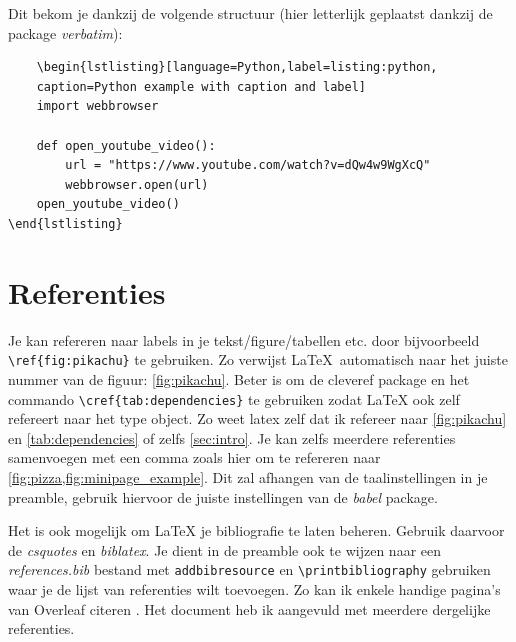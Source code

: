 \documentclass{article}
\begin{document}
Dit bekom je dankzij de volgende structuur (hier letterlijk geplaatst dankzij de package \textit{verbatim}):
\begin{verbatim}
    \begin{lstlisting}[language=Python,label=listing:python,
    caption=Python example with caption and label]    
    import webbrowser
    
    def open_youtube_video():
        url = "https://www.youtube.com/watch?v=dQw4w9WgXcQ"
        webbrowser.open(url)
    open_youtube_video()
\end{lstlisting}
\end{verbatim}

\section{Referenties}
Je kan refereren naar labels in je tekst/figure/tabellen etc. door bijvoorbeeld \verb|\ref{fig:pikachu}| te gebruiken.
Zo verwijst \LaTeX ~automatisch naar het juiste nummer van de figuur: \ref{fig:pikachu}.
Beter is om de cleveref package en het commando \verb|\cref{tab:dependencies}| te gebruiken zodat LaTeX ook zelf refereert naar het type object.
Zo weet latex zelf dat ik refereer naar \cref{fig:pikachu} en \cref{tab:dependencies} of zelfs \cref{sec:intro}.
Je kan zelfs meerdere referenties samenvoegen met een comma zoals hier om te refereren naar \cref{fig:pizza,fig:minipage_example}.
Dit zal afhangen van de taalinstellingen in je preamble, gebruik hiervoor de juiste instellingen van de \textit{babel} package.

Het is ook mogelijk om LaTeX je bibliografie te laten beheren.
Gebruik daarvoor de \textit{csquotes} en \textit{biblatex}.
Je dient in de preamble ook te wijzen naar een \textit{references.bib} bestand met \verb|addbibresource| en \verb|\printbibliography| gebruiken waar je de lijst van referenties wilt toevoegen.
Zo kan ik enkele handige pagina's van Overleaf citeren \cite{Overleaf30min}.
Het document heb ik aangevuld met meerdere dergelijke referenties.

\printbibliography
\end{document}
